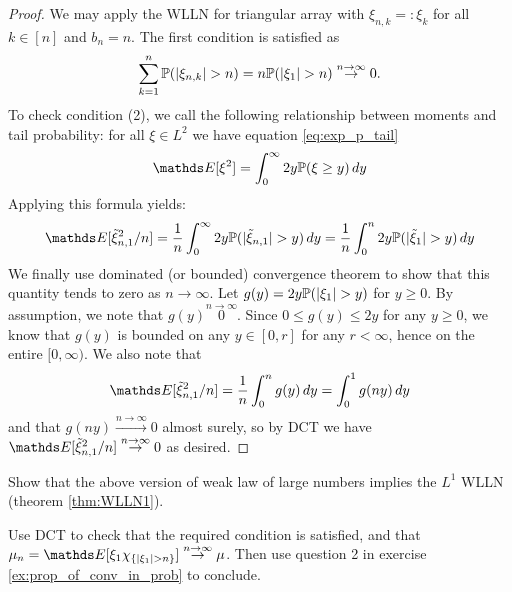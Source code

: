 \begin{unexaminable}
\begin{proof}
We may apply the WLLN for triangular array with $\xi_{n,k} =: \xi_k$ for all $k \in [n]$ and $b_n = n$. The first condition is satisfied as 
\begin{equation*}
\sum_{k=1}^n \mathbb{P}(|\xi_{n,k}| > n) = n\mathbb{P}(|\xi_1| > n) \overset{n\to\infty}\to 0.
\end{equation*}
To check condition (2), we call the following relationship between moments and tail probability: for all $\xi \in L^2$ we have equation \eqref{eq:exp_p_tail}
\begin{equation}
\E[\xi^2] = \int_0^\infty 2y \p(\xi\geq y) \, dy
\end{equation}
Applying this formula yields:
\begin{equation}
\E[\tilde{\xi}^2_{n,1}/n] = \frac{1}{n}\int_0^\infty 2y\p(|\tilde{\xi}_{n,1}| > y) \, dy = \frac{1}{n}\int_0^n 2y\p(|\tilde{\xi}_1| > y) \, dy
\end{equation}
We finally use dominated (or bounded) convergence theorem to show that this quantity tends to zero as $n\to\infty$. Let $g(y) = 2y \mathbb{P}(|\xi_1| > y)$ for $y\geq 0$. By assumption, we note that $g(y) \overset{n\to\infty} 0$. Since $0 \leq g(y) \leq 2y$ for any $y \geq 0$, we know that $g(y)$ is bounded on any $y \in [0,r]$ for any $r<\infty$, hence on the entire $[0,\infty)$. We also note that
\begin{equation}
    \E[\tilde{\xi}^2_{n,1}/n] = \frac{1}{n} \int_0^n g(y) \, dy = \int_0^1 g(ny) \, dy
\end{equation}
and that $g(ny) \overset{n\to\infty}{\to} 0$ almost surely, so by DCT we have $\E[\tilde{\xi}^2_{n,1}/n] \overset{n\to\infty}\to 0$ as desired.
\end{proof}

\begin{exercise}
Show that the above version of weak law of large numbers implies the $L^1$ WLLN (theorem \ref{thm:WLLN1}).
\end{exercise}

\begin{hint}
Use DCT to check that the required condition is satisfied, and that $\mu_n = \E[\xi_1 \chi_{\set{|\xi_1|>n}}] \overset{n\to\infty}\to \mu$. Then use question 2 in exercise \ref{ex:prop_of_conv_in_prob} to conclude.
\end{hint}
\end{unexaminable}


